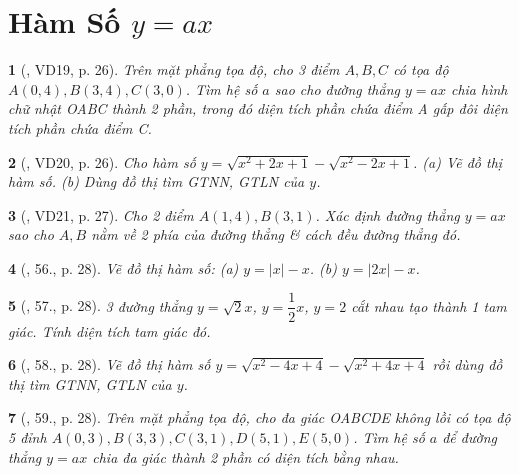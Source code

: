 \documentclass{article}
\newtheorem{baitoan}{}
\begin{document}

\section{Hàm Số $y = ax$}

\begin{baitoan}[\cite{Binh_Toan_9_tap_1}, VD19, p. 26]
	Trên mặt phẳng tọa độ, cho 3 điểm $A,B,C$ có tọa độ $A(0,4),B(3,4),C(3,0)$. Tìm hệ số $a$ sao cho đường thẳng $y = ax$ chia hình chữ nhật OABC thành 2 phần, trong đó diện tích phần chứa điểm A gấp đôi diện tích phần chứa điểm C.
\end{baitoan}

\begin{baitoan}[\cite{Binh_Toan_9_tap_1}, VD20, p. 26]
	Cho hàm số $y = \sqrt{x^2 + 2x + 1} - \sqrt{x^2 - 2x + 1}$. (a) Vẽ đồ thị hàm số. (b) Dùng đồ thị tìm {\rm GTNN, GTLN} của $y$.
\end{baitoan}

\begin{baitoan}[\cite{Binh_Toan_9_tap_1}, VD21, p. 27]
	Cho 2 điểm $A(1,4),B(3,1)$. Xác định đường thẳng $y = ax$ sao cho $A,B$ nằm về 2 phía của đường thẳng \& cách đều đường thẳng đó.
\end{baitoan}

\begin{baitoan}[\cite{Binh_Toan_9_tap_1}, 56., p. 28]
	Vẽ đồ thị hàm số: (a) $y = |x| - x$. (b) $y = |2x| - x$.
\end{baitoan}

\begin{baitoan}[\cite{Binh_Toan_9_tap_1}, 57., p. 28]
	3 đường thẳng $y = \sqrt{2}x$, $y = \dfrac{1}{2}x$, $y = 2$ cắt nhau tạo thành 1 tam giác. Tính diện tích tam giác đó.
\end{baitoan}

\begin{baitoan}[\cite{Binh_Toan_9_tap_1}, 58., p. 28]
	Vẽ đồ thị hàm số $y = \sqrt{x^2 - 4x + 4} - \sqrt{x^2 + 4x + 4}$ rồi dùng đồ thị tìm {\rm GTNN, GTLN} của $y$.
\end{baitoan}

\begin{baitoan}[\cite{Binh_Toan_9_tap_1}, 59., p. 28]
	Trên mặt phẳng tọa độ, cho đa giác OABCDE không lồi có tọa độ 5 đỉnh $A(0,3),B(3,3),C(3,1),D(5,1),E(5,0)$. Tìm hệ số $a$ để đường thẳng $y = ax$ chia đa giác thành 2 phần có diện tích bằng nhau.
\end{baitoan}
\end{document}

